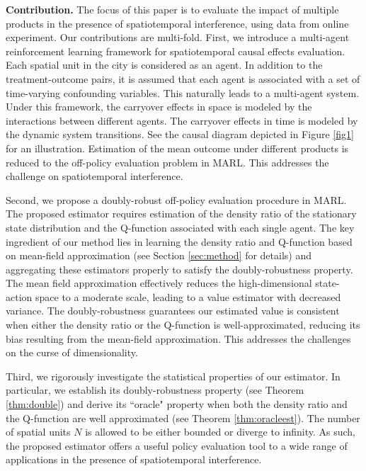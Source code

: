 \documentclass{article}
\begin{document}
\textbf{Contribution.} The focus of this paper is to evaluate the impact of multiple products in the presence of spatiotemporal interference, using data from online experiment. %
Our contributions are multi-fold. First, we introduce a multi-agent reinforcement learning \citep[MARL, see e.g.,][]{nowe2012game} framework for spatiotemporal causal effects evaluation. Each spatial unit in the city is considered as an agent. In addition to the treatment-outcome pairs, it is assumed that each agent is associated with a set of time-varying confounding variables. This naturally leads to a multi-agent system. Under this framework, the carryover effects in space is modeled by the interactions between different agents. The carryover effects in time is modeled by the dynamic system transitions. See the causal diagram depicted in Figure \ref{fig1} for an illustration. Estimation of the mean outcome under different products is reduced to the off-policy evaluation problem in MARL. This addresses the challenge on spatiotemporal interference. 

Second, we propose a doubly-robust off-policy evaluation procedure in MARL. The proposed estimator requires estimation of the density ratio of the stationary state distribution and the Q-function associated with each single agent. The key ingredient of our method lies in learning the density ratio and Q-function based on mean-field approximation (see Section \ref{sec:method} for details) and aggregating these estimators properly to satisfy the doubly-robustness property. The mean field approximation effectively reduces the high-dimensional state-action space to a moderate scale, leading to a value estimator with decreased variance. The doubly-robustness guarantees our estimated value is consistent when either the density ratio or the Q-function is well-approximated, reducing its bias resulting from the mean-field approximation. This addresses the challenges on the curse of dimensionality. 

Third, we rigorously investigate the statistical properties of our estimator. %
In particular, we establish its doubly-robustness property (see Theorem \ref{thm:double}) and derive its ``oracle" property when both the density ratio and the Q-function are well approximated (see Theorem \ref{thm:oracleest}). The number of spatial units $N$ is allowed to be either bounded or diverge to infinity. As such, the proposed estimator offers a useful policy evaluation tool to a wide range of applications in the presence of spatiotemporal interference. 
\end{document}
